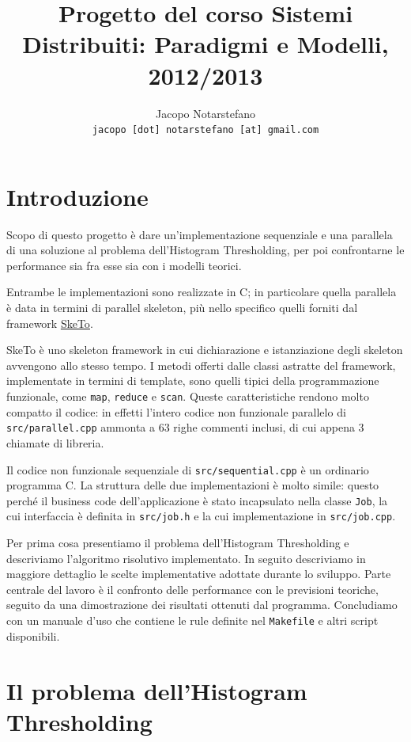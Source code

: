\documentclass[12pt]{article}
\title{Progetto del corso Sistemi Distribuiti: Paradigmi e Modelli, 2012/2013}
\author{
	Jacopo Notarstefano\\
	\texttt{jacopo [dot] notarstefano [at] gmail.com}
}
\date{}
\newcommand{\cpp}{C\nolinebreak\hspace{-.05em}\raisebox{.4ex}{\tiny\bf +}\nolinebreak\hspace{-.10em}\raisebox{.4ex}{\tiny\bf +}}
\begin{document}
  \maketitle
    \section{Introduzione}

    Scopo di questo progetto è dare un'implementazione sequenziale e una
    parallela di una soluzione al problema dell'Histogram Thresholding, per
    poi confrontarne le performance sia fra esse sia con i modelli teorici.

    Entrambe le implementazioni sono realizzate in \cpp; in particolare
    quella parallela è data in termini di parallel skeleton, più nello
    specifico quelli forniti dal framework 
    \href{http://sketo.ipl-lab.org/}{\underline{SkeTo}}.

    SkeTo è uno skeleton framework in cui dichiarazione e istanziazione degli
    skeleton avvengono allo stesso tempo. I metodi offerti dalle classi
    astratte del framework, implementate in termini di template, sono quelli
    tipici della programmazione funzionale, come \texttt{map}, \texttt{reduce}
    e \texttt{scan}. Queste caratteristiche rendono molto compatto il codice:
    in effetti l'intero codice non funzionale parallelo di
    \texttt{src/parallel.cpp} ammonta a \(63\) righe commenti inclusi, di cui
    appena \(3\) chiamate di libreria.

    Il codice non funzionale sequenziale di \texttt{src/sequential.cpp} \`e
    un ordinario programma \cpp. La struttura delle due implementazioni \`e
    molto simile: questo perch\'e il business code dell'applicazione \`e
    stato incapsulato nella classe \texttt{Job}, la cui interfaccia \`e
    definita in \texttt{src/job.h} e la cui implementazione in
    \texttt{src/job.cpp}.

    Per prima cosa presentiamo il problema dell'Histogram Thresholding e
    descriviamo l'algoritmo risolutivo implementato. In seguito descriviamo in
    maggiore dettaglio le scelte implementative adottate durante lo sviluppo.
    Parte centrale del lavoro \`e il confronto delle performance con le
    previsioni teoriche, seguito da una dimostrazione dei risultati ottenuti
    dal programma. Concludiamo con un manuale d'uso che contiene le rule
    definite nel \texttt{Makefile} e altri script disponibili.

    \section{Il problema dell'Histogram Thresholding}
\end{document}

